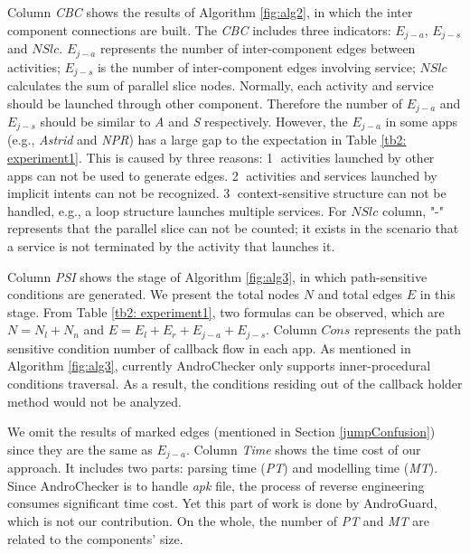 Column \textit{CBC} shows the results of Algorithm \ref{fig:alg2}, in which the inter component connections are built. The \textit{CBC} includes three indicators: $E_{j-a}$, $E_{j-s}$ and $NSlc$. $E_{j-a}$ represents the number of inter-component edges between activities; $E_{j-s}$ is the number of inter-component edges involving service; $NSlc$ calculates the sum of parallel slice nodes. Normally, each activity and service should be launched through other component. Therefore the number of $E_{j-a}$ and $E_{j-s}$ should be similar to \textit{A} and \textit{S} respectively. However, the $E_{j-a}$ in some apps (e.g., \textit{Astrid} and \textit{NPR}) has a large gap to the expectation in Table \ref{tb2: experiment1}. This is caused by three reasons: \textcircled{1} activities launched by other apps can not be used to generate edges. \textcircled{2} activities and services launched by implicit intents can not be recognized. \textcircled{3} context-sensitive structure can not be handled, e.g., a loop structure launches multiple services. For $NSlc$ column, "-" represents that the parallel slice can not be counted; it exists in the scenario that a service is not terminated by the activity that launches it.

Column \textit{PSI} shows the stage of Algorithm \ref{fig:alg3}, in which path-sensitive conditions are generated. We present the total nodes $N$ and total edges $E$ in this stage. From Table \ref{tb2: experiment1}, two formulas can be observed, which are $N = N_{l} + N_{n}$ and $E = E_{l} + E_{r} + E_{j-a} + E_{j-s}$. Column $Cons$ represents the path sensitive condition number of callback flow in each app. As mentioned in Algorithm \ref{fig:alg3}, currently AndroChecker only supports inner-procedural conditions traversal. As a result, the conditions residing out of the callback holder method would not be analyzed. 

We omit the results of marked edges (mentioned in Section \ref{jumpConfusion}) since they are the same as $E_{j-a}$. Column \textit{Time} shows the time cost of our approach. It includes two parts: parsing time (\textit{PT}) and modelling time (\textit{MT}). Since AndroChecker is to handle \textit{apk} file, the process of reverse engineering consumes significant time cost. Yet this part of work is done by AndroGuard, which is not our contribution. On the whole, the number of \textit{PT} and \textit{MT} are related to the components' size. 

